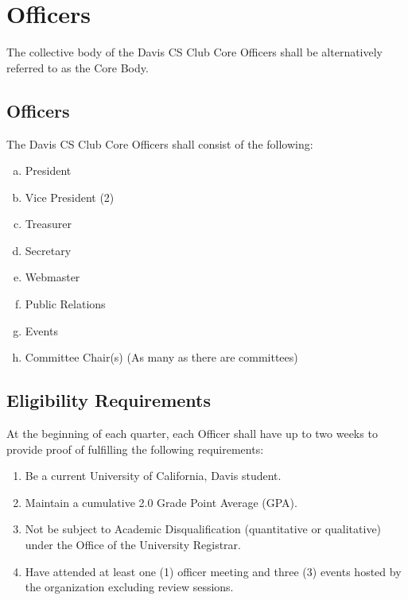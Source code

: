 \documentclass{article}
\newenvironment{li}{
\begin{enumerate}
  \setlength{\itemsep}{1pt}
  \setlength{\parskip}{0pt}
  \setlength{\parsep}{0pt}
}{\end{enumerate}}
\begin{document}
\section{Officers}
The collective body of the Davis CS Club Core Officers shall be alternatively referred to as the Core Body.

\subsection{Officers}
The Davis CS Club Core Officers shall consist of the following:
\begin{enumerate}[a.]
  \setlength{\itemsep}{1pt}
  \setlength{\parskip}{0pt}
  \setlength{\parsep}{0pt}
\item President
\item Vice President (2)
\item Treasurer
\item Secretary
\item Webmaster
\item Public Relations
\item Events
\item Committee Chair(s) (As many as there are committees)
\end{enumerate}

\subsection{Eligibility Requirements}
At the beginning of each quarter, each Officer shall have up to two weeks to provide proof of fulfilling the following requirements:
\begin{li}
\item Be a current University of California, Davis student.
\item Maintain a cumulative 2.0 Grade Point Average (GPA).
\item Not be subject to Academic Disqualification (quantitative or qualitative) under the Office of the University Registrar.
\item Have attended at least one (1) officer meeting and three (3) events hosted by the organization excluding review sessions.
\end{li}
\end{document}
